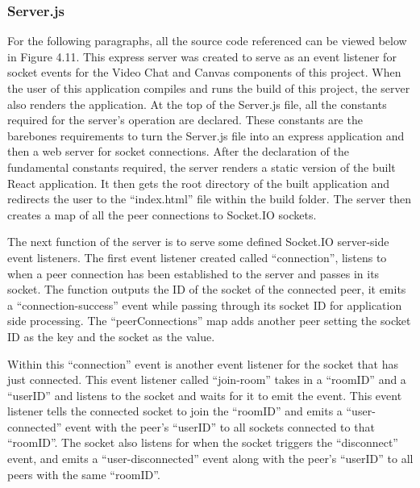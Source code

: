 \subsubsection{Server.js}
For the following paragraphs, all the source code referenced can be viewed below in Figure 4.11. 
This express server was created to serve as an event listener for socket events for the Video Chat and Canvas components of this project. When the user of this application compiles and runs the build of this project, the server also renders the application.
At the top of the Server.js file, all the constants required for the server’s operation are declared. These constants are the barebones requirements to turn the Server.js file into an express application and then a web server for socket connections. After the declaration of the fundamental constants required, the server renders a static version of the built React application. It then gets the root directory of the built application and redirects the user to the “index.html” file within the build folder. The server then creates a map of all the peer connections to Socket.IO sockets.

The next function of the server is to serve some defined Socket.IO server-side event listeners. The first event listener created called “connection”, listens to when a peer connection has been established to the server and passes in its socket. The function outputs the ID of the socket of the connected peer, it emits a “connection-success” event while passing through its socket ID for application side processing. The “peerConnections” map adds another peer setting the socket ID as the key and the socket as the value.

Within this “connection” event is another event listener for the socket that has just connected. This event listener called “join-room” takes in a “roomID” and a “userID” and listens to the socket and waits for it to emit the event. This event listener tells the connected socket to join the “roomID” and emits a “user-connected” event with the peer’s “userID” to all sockets connected to that “roomID”. The socket also listens for when the socket triggers the “disconnect” event, and emits a “user-disconnected” event along with the peer’s “userID” to all peers with the same “roomID”.

